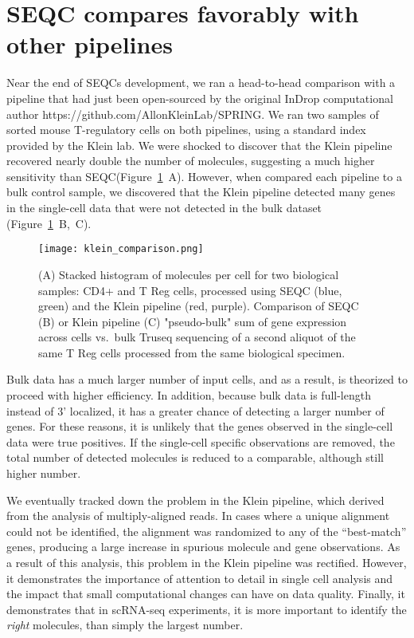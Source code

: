 \section{SEQC compares favorably with other pipelines}

Near the end of SEQCs development, we ran a head-to-head comparison with a pipeline that had just been open-sourced by the original InDrop computational author {\mono https://github.com/AllonKleinLab/SPRING}. 
We ran two samples of sorted mouse T-regulatory cells on both pipelines, using a standard index provided by the Klein lab. 
We were shocked to discover that the Klein pipeline recovered nearly double the number of molecules, suggesting a much higher sensitivity than SEQC\@ (Figure~\ref{fig:klein}~A).
However, when compared each pipeline to a bulk control sample, we discovered that the Klein pipeline detected many genes in the single-cell data that were not detected in the bulk dataset (Figure~\ref{fig:klein}~B,~C). 

\begin{figure}
\centering
\texttt{[image: klein\_comparison.png]}
\caption{(A) Stacked histogram of molecules per cell for two biological samples: CD4+ and T Reg cells, processed using SEQC (blue, green) and the Klein pipeline (red, purple).
Comparison of SEQC (B) or Klein pipeline (C) "pseudo-bulk" sum of gene expression across cells vs.\ bulk Truseq sequencing of a second aliquot of the same T Reg cells processed from the same biological specimen.}
\label{fig:klein}
\end{figure}

Bulk data has a much larger number of input cells, and as a result, is theorized to proceed with higher efficiency. 
In addition, because bulk data is full-length instead of 3' localized, it has a greater chance of detecting a larger number of genes. 
For these reasons, it is unlikely that the genes observed in the single-cell data were true positives.
If the single-cell specific observations are removed, the total number of detected molecules is reduced to a comparable, although still higher number. 

We eventually tracked down the problem in the Klein pipeline, which derived from the analysis of multiply-aligned reads. In cases where a unique alignment could not be identified, the alignment was randomized to any of the ``best-match'' genes, producing a large increase in spurious molecule and gene observations. 
As a result of this analysis, this problem in the Klein pipeline was rectified. 
However, it demonstrates the importance of attention to detail in single cell analysis and the impact that small computational changes can have on data quality. 
Finally, it demonstrates that in scRNA-seq experiments, it is more important to identify the \textit{right} molecules, than simply the largest number. 

